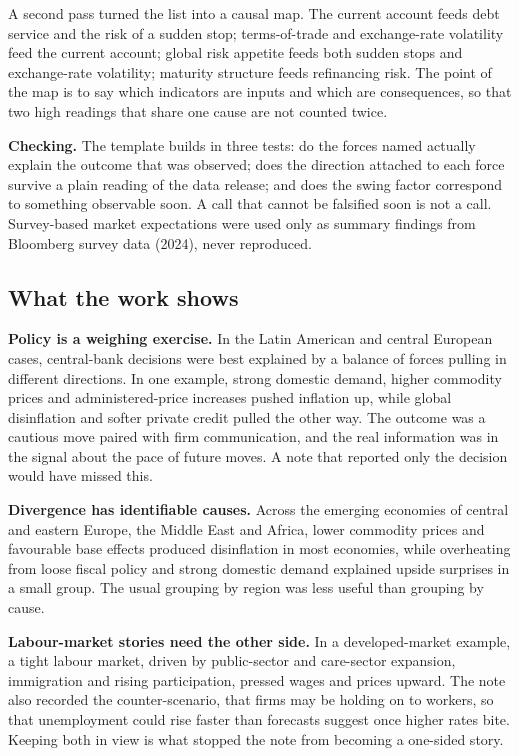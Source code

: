 \documentclass[
  british,
  a4paper,
]{article}
\begin{document}
A second pass turned the list into a causal map. The current account
feeds debt service and the risk of a sudden stop; terms-of-trade and
exchange-rate volatility feed the current account; global risk appetite
feeds both sudden stops and exchange-rate volatility; maturity structure
feeds refinancing risk. The point of the map is to say which indicators
are inputs and which are consequences, so that two high readings that
share one cause are not counted twice.

\textbf{Checking.} The template builds in three tests: do the forces
named actually explain the outcome that was observed; does the direction
attached to each force survive a plain reading of the data release; and
does the swing factor correspond to something observable soon. A call
that cannot be falsified soon is not a call. Survey-based market
expectations were used only as summary findings from Bloomberg survey
data (2024), never reproduced.

\subsection{What the work shows}\label{what-the-work-shows}

\textbf{Policy is a weighing exercise.} In the Latin American and
central European cases, central-bank decisions were best explained by a
balance of forces pulling in different directions. In one example,
strong domestic demand, higher commodity prices and administered-price
increases pushed inflation up, while global disinflation and softer
private credit pulled the other way. The outcome was a cautious move
paired with firm communication, and the real information was in the
signal about the pace of future moves. A note that reported only the
decision would have missed this.

\textbf{Divergence has identifiable causes.} Across the emerging
economies of central and eastern Europe, the Middle East and Africa,
lower commodity prices and favourable base effects produced disinflation
in most economies, while overheating from loose fiscal policy and strong
domestic demand explained upside surprises in a small group. The usual
grouping by region was less useful than grouping by cause.

\textbf{Labour-market stories need the other side.} In a
developed-market example, a tight labour market, driven by public-sector
and care-sector expansion, immigration and rising participation, pressed
wages and prices upward. The note also recorded the counter-scenario,
that firms may be holding on to workers, so that unemployment could rise
faster than forecasts suggest once higher rates bite. Keeping both in
view is what stopped the note from becoming a one-sided story.
\end{document}
